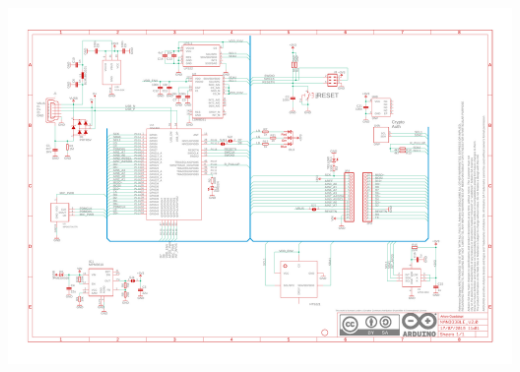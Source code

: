 \setcounter{mycounter}{1}

{
	\includegraphics[width=1\textwidth,page=\themycounter]{../../MLbib/Arduino/Nano33BLESense/NANO33BLE_V2.0_sch.pdf}
	\newpage
}
%
%
%
%
